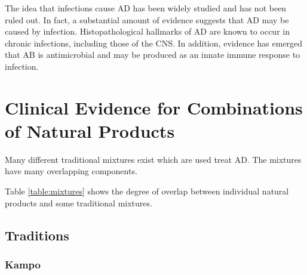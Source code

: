 \documentclass[twocolumn]{article}
\begin{document}
The idea that infections cause AD has been widely studied and
has not been ruled out. In fact,
a substantial amount of evidence suggests that
AD may be caused by infection.
\cite{mawanda2013can}
Histopathological hallmarks of AD are known to occur in
chronic infections, including those of the CNS.
\cite{
iked1995numerous,
mandybur1990distribution,
kueh1984amyloid,
liberski1994transmissible,
kobayashi2008plaque,
sikorska2009ultrastructural,
de1984serum,
looi1988immunohistochemical,
rocken1999generalized,
wangel1982family,
tank2000renal,
urban1993ct}
In addition, evidence has emerged that AB is antimicrobial
and may be produced as an innate immune response to infection.
\cite{soscia2010alzheimer}










%




\section{Clinical Evidence for Combinations of Natural Products}

Many different traditional mixtures exist which are used
treat AD. The mixtures have many overlapping components.

Table \ref{table:mixtures} shows the degree of overlap between
individual natural products and some traditional mixtures.




\subsection{Traditions}
\subsubsection{Kampo}
\end{document}
